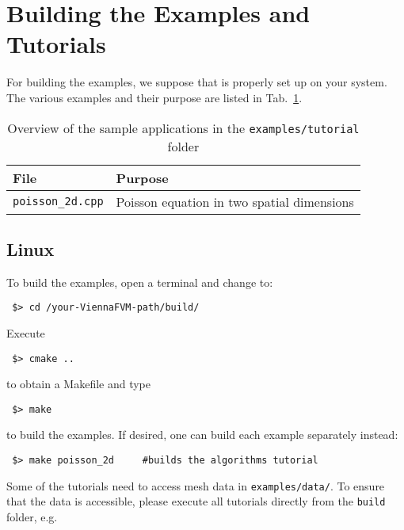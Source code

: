 \section{Building the Examples and Tutorials}
For building the examples, we suppose that {\CMake} is properly set up
on your system. The various examples and their purpose are listed in
Tab.~\ref{tab:tutorial-dependencies}.

\begin{table}[tb]
\begin{center}
\begin{tabular}{l|p{9.3cm}}
File & Purpose\\
\hline
\texttt{poisson\_2d.cpp}              & Poisson equation in two spatial dimensions
\end{tabular}
\caption{Overview of the sample applications in the \texttt{examples/tutorial} folder}
\label{tab:tutorial-dependencies}
\end{center}
\end{table}

\subsection{Linux}
To build the examples, open a terminal and change to:

\begin{lstlisting}
 $> cd /your-ViennaFVM-path/build/
\end{lstlisting}
Execute
\begin{lstlisting}
 $> cmake ..
\end{lstlisting}
to obtain a Makefile and type
\begin{lstlisting}
 $> make
\end{lstlisting}
to build the examples. If desired, one can build each example separately instead:
\begin{lstlisting}
 $> make poisson_2d     #builds the algorithms tutorial
\end{lstlisting}


Some of the tutorials need to access mesh data in \texttt{examples/data/}.
To ensure that the data is accessible, please execute all tutorials directly from the \texttt{build} folder, e.g.

